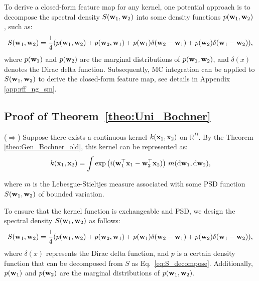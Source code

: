 \begin{remark} 
    To derive a closed-form feature map for any kernel, one potential approach is to decompose the spectral density \( S({\mathbf w}_1, {\mathbf w}_2) \) into some density functions \( p({\mathbf w}_1, {\mathbf w}_2) \) \citep{ton2018spatial, samo2015generalized}, such as:
    \begin{equation}
    \begin{aligned}
    \label{eq:S_decompose1}
    S({\mathbf w}_1, {\mathbf w}_2) = \frac{1}{4}(p({\mathbf w}_1, {\mathbf w}_2) + p({\mathbf w}_2, {\mathbf w}_1) + p({\mathbf w}_1)\delta({\mathbf w}_2 - {\mathbf w}_1) + p({\mathbf w}_2)\delta({\mathbf w}_1 - {\mathbf w}_2)),
    \end{aligned}
    \end{equation}
    where  \( p({\mathbf w}_1) \) and \( p({\mathbf w}_2) \) are the marginal distributions of \( p({\mathbf w}_1, {\mathbf w}_2) \), and \( \delta(x) \) denotes the Dirac delta function. Subsequently, \MakeUppercase{mc} integration can be applied to \( S({\mathbf w}_1, {\mathbf w}_2) \) to derive the closed-form feature map, see details in Appendix \ref{app:rff_ng_sm}. 
\end{remark}

\subsection{Proof of Theorem~\ref{theo:Uni_Bochner}}
\label{app:new_bochner_theorem}


($\Longrightarrow$) 
Suppose there exists a continuous kernel \( k({\mathbf x}_1, {\mathbf x}_2) \) on \(\mathbb{R}^D\). By the Theorem \ref{theo:Gen_Bochner_old}, this kernel can be represented as:
\[
k({\mathbf x}_1, {\mathbf x}_2) = \int \exp\left(i({\mathbf w}_1^{\top} {\mathbf x}_1 - {\mathbf w}_2^{\top} {\mathbf x}_2)\right) \, m(\mathrm{d}{\mathbf w}_1, \mathrm{d}{\mathbf w}_2),
\]

where \( m \) is the Lebesgue-Stieltjes measure associated with some PSD function \( S({\mathbf w}_1, {\mathbf w}_2) \) of bounded variation.

To ensure that the kernel function is exchangeable and PSD, we design the spectral density \( S({\mathbf w}_1, {\mathbf w}_2) \) as follows: 
\begin{equation}
\begin{aligned}
\label{eq:S_decompose}
S({\mathbf w}_1, {\mathbf w}_2) = \frac{1}{4}(p({\mathbf w}_1, {\mathbf w}_2) + p({\mathbf w}_2, {\mathbf w}_1) + p({\mathbf w}_1)\delta({\mathbf w}_2 - {\mathbf w}_1) + p({\mathbf w}_2)\delta({\mathbf w}_1 - {\mathbf w}_2)),
\end{aligned}
\end{equation}
where $\delta(x)$ represents the Dirac delta function, and $p$ is a certain density function that can be decomposed from $S$ as Eq.~\eqref{eq:S_decompose}. Additionally, \( p({\mathbf w}_1) \) and \( p({\mathbf w}_2) \) are the marginal distributions of \( p({\mathbf w}_1, {\mathbf w}_2) \).

